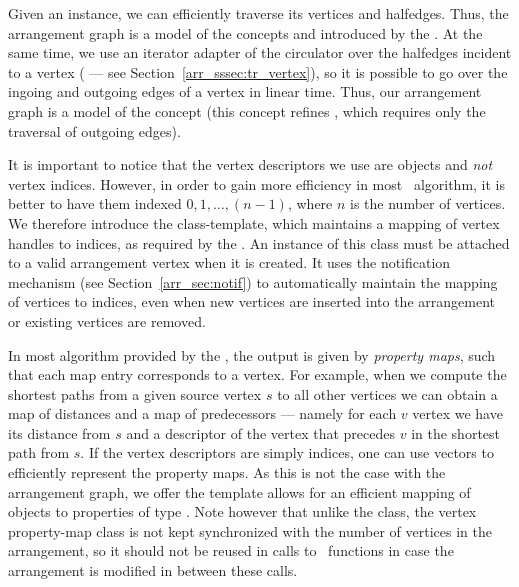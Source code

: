 Given an  instance, we can efficiently traverse its
vertices and halfedges. Thus, the arrangement graph is a model of the concepts
 and  introduced by the \bgl.
At the same time, we use an iterator adapter of the circulator over the
halfedges incident to a vertex ( --- see
Section~\ref{arr_sssec:tr_vertex}), so it is possible to go over the ingoing
and outgoing edges of a vertex in linear time. Thus, our arrangement graph
is a model of the concept  (this concept refines
, which requires only the traversal of outgoing edges).

It is important to notice that the vertex descriptors we use are
 objects and {\em not} vertex indices. However, in order
to gain more efficiency in most \bgl\ algorithm, it is better to have them
indexed $0, 1, \ldots, (n-1)$, where $n$ is the number of vertices. We
therefore introduce the  class-template,
which maintains a mapping of vertex handles to indices, as required by the
\bgl. An instance of this class must be attached to a valid arrangement
vertex when it is created. It uses the notification mechanism (see
Section~\ref{arr_sec:notif}) to automatically maintain the mapping of vertices
to indices, even when new vertices are inserted into the arrangement or
existing vertices are removed.

In most algorithm provided by the \bgl, the output is given by
{\em property maps}, such that each map entry corresponds to a vertex.
For example, when we compute the shortest paths from a given source vertex
$s$ to all other vertices we can obtain a map of distances and a map of
predecessors --- namely for each $v$ vertex we have its distance from $s$
and a descriptor of the vertex that precedes $v$ in the shortest path from $s$.
If the vertex descriptors are simply indices, one can use vectors to
efficiently represent the property maps. As this is not the case with the
arrangement graph, we offer the 
template allows for an efficient mapping of  objects to
properties of type . Note however that unlike the
 class, the vertex property-map class is not
kept synchronized with the number of vertices in the arrangement, so it
should not be reused in calls to \bgl\ functions in case the arrangement
is modified in between these calls.

